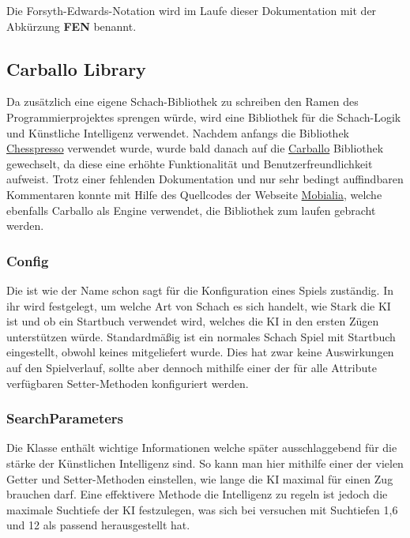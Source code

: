 Die Forsyth-Edwards-Notation wird im Laufe dieser Dokumentation mit der
Abkürzung \textbf{FEN} benannt.

\subsection{Carballo Library}
\subsectionauthor{\oliver}

Da zusätzlich eine eigene Schach-Bibliothek zu schreiben den Ramen des
Programmierprojektes sprengen würde, wird eine Bibliothek für die Schach-Logik
und Künstliche Intelligenz verwendet. Nachdem anfangs die Bibliothek
\href{http://www.chesspresso.org/}{Chesspresso} verwendet wurde, wurde bald
danach auf die \href{https://github.com/albertoruibal/carballo}{Carballo}
Bibliothek gewechselt, da diese eine erhöhte Funktionalität und
Benutzerfreundlichkeit aufweist. Trotz einer fehlenden Dokumentation und nur
sehr bedingt auffindbaren Kommentaren konnte mit Hilfe des Quellcodes der
Webseite \href{https://www.mobialia.com/webchessgwt/}{Mobialia}, welche
ebenfalls Carballo als Engine verwendet, die Bibliothek zum laufen gebracht
werden.

\subsubsection{Config}

Die  ist wie der Name schon sagt für die Konfiguration eines Spiels 
zuständig. In ihr wird festgelegt, um welche Art von Schach es sich handelt, wie 
Stark die KI ist und ob ein Startbuch verwendet wird, welches die KI in den 
ersten Zügen unterstützen würde. Standardmäßig ist  ein normales Schach Spiel 
mit Startbuch eingestellt, obwohl keines mitgeliefert wurde. Dies hat zwar keine 
Auswirkungen auf den Spielverlauf, sollte aber dennoch mithilfe einer der für 
alle Attribute verfügbaren Setter-Methoden konfiguriert werden.

\subsubsection{SearchParameters}

Die Klasse  enthält wichtige Informationen welche später 
ausschlaggebend für die stärke der Künstlichen Intelligenz sind. So kann man 
hier mithilfe einer der vielen Getter und Setter-Methoden einstellen, wie lange 
die KI maximal für einen Zug brauchen darf. Eine effektivere Methode die 
Intelligenz zu regeln ist jedoch die maximale Suchtiefe der KI festzulegen, was 
sich bei versuchen mit Suchtiefen 1,6 und 12 als passend herausgestellt hat.

